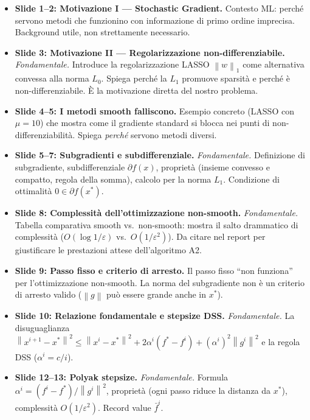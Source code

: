 \documentclass[a4paper,11pt]{article}
\theoremstyle{definition}
\newcommand{\norm}[1]{\left\lVert #1 \right\rVert}
\begin{document}
\begin{itemize}
  \item \textbf{Slide 1--2: Motivazione I --- Stochastic Gradient.} Contesto ML: perché servono metodi che funzionino con informazione di primo ordine imprecisa. Background utile, non strettamente necessario.

  \item \textbf{Slide 3: Motivazione II --- Regolarizzazione non-differenziabile.} \emph{Fondamentale.} Introduce la regolarizzazione LASSO $\norm{w}_1$ come alternativa convessa alla norma $L_0$. Spiega perché la $L_1$ promuove sparsità e perché è non-differenziabile. È la motivazione diretta del nostro problema.

  \item \textbf{Slide 4--5: I metodi smooth falliscono.} Esempio concreto (LASSO con $\mu=10$) che mostra come il gradiente standard si blocca nei punti di non-differenziabilità. Spiega \emph{perché} servono metodi diversi.

  \item \textbf{Slide 5--7: Subgradienti e subdifferenziale.} \emph{Fondamentale.} Definizione di subgradiente, subdifferenziale $\partial f(x)$, proprietà (insieme convesso e compatto, regola della somma), calcolo per la norma $L_1$. Condizione di ottimalità $0 \in \partial f(x^*)$.

  \item \textbf{Slide 8: Complessità dell'ottimizzazione non-smooth.} \emph{Fondamentale.} Tabella comparativa smooth vs.\ non-smooth: mostra il salto drammatico di complessità ($O(\log 1/\varepsilon)$ vs.\ $O(1/\varepsilon^2)$). Da citare nel report per giustificare le prestazioni attese dell'algoritmo A2.

  \item \textbf{Slide 9: Passo fisso e criterio di arresto.} Il passo fisso ``non funziona'' per l'ottimizzazione non-smooth. La norma del subgradiente non è un criterio di arresto valido ($\norm{g}$ può essere grande anche in $x^*$).

  \item \textbf{Slide 10: Relazione fondamentale e stepsize DSS.} \emph{Fondamentale.} La disuguaglianza $\norm{x^{i+1}-x^*}^2 \leq \norm{x^i-x^*}^2 + 2\alpha^i(f^*-f^i) + (\alpha^i)^2\norm{g^i}^2$ e la regola DSS ($\alpha^i = c/i$).

  \item \textbf{Slide 12--13: Polyak stepsize.} \emph{Fondamentale.} Formula $\alpha^i = (f^i - f^*)/\norm{g^i}^2$, proprietà (ogni passo riduce la distanza da $x^*$), complessità $O(1/\varepsilon^2)$. Record value $\bar{f}^i$.


\end{itemize}
\end{document}
